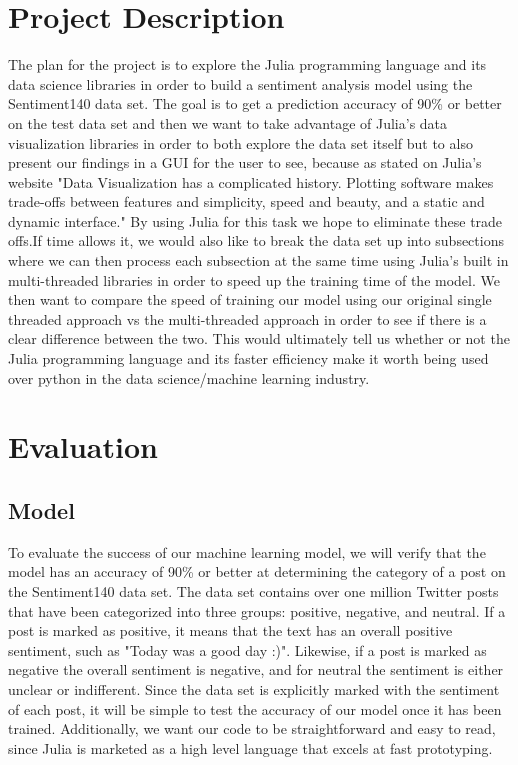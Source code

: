 \documentclass{article}
\begin{document}
\section{Project Description}
The plan for the project is to explore the Julia programming language and its data science libraries in order to build a sentiment analysis model using the Sentiment140 data set. The goal is to get a prediction accuracy of 90\% or better on the test data set and then we want to take advantage of Julia's data visualization libraries in order to both explore the data set itself but to also present our findings in a GUI for the user to see, because as stated on Julia's website "Data Visualization has a complicated history. Plotting software makes trade-offs between features and simplicity, speed and beauty, and a static and dynamic interface."\cite{Julia2020-2} By using Julia for this task we hope to eliminate these trade offs.If time allows it, we would also like to break the data set up into subsections where we can then process each subsection at the same time using Julia's built in multi-threaded libraries in order to speed up the training time of the model. We then want to compare the speed of training our model using our original single threaded approach vs the multi-threaded approach in order to see if there is a clear difference between the two. This would ultimately tell us whether or not the Julia programming language and its faster efficiency make it worth being used over python in the data science/machine learning industry.
 
\section{Evaluation}

\subsection{Model}
To evaluate the success of our machine learning model, we will verify that the model has an accuracy of 90\% or better at determining the category of a post on the Sentiment140 data set. The data set contains over one million Twitter posts that have been categorized into three groups: positive, negative, and neutral. If a post is marked as positive, it means that the text has an overall positive sentiment, such as "Today was a good day :)". Likewise, if a post is marked as negative the overall sentiment is negative, and for neutral the sentiment is either unclear or indifferent. Since the data set is explicitly marked with the sentiment of each post, it will be simple to test the accuracy of our model once it has been trained. Additionally, we want our code to be straightforward and easy to read, since Julia is marketed as a high level language that excels at fast prototyping.
\end{document}
